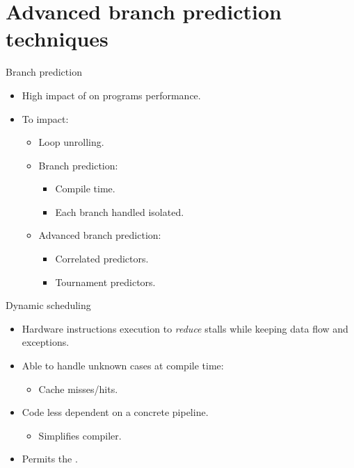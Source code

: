 \section{Advanced branch prediction techniques}

\begin{frame}[t]{Branch prediction}
\begin{itemize}
  \item High impact of  on programs performance.

  \item To  impact:
    \begin{itemize}
      \item Loop unrolling.
      \item Branch prediction:
        \begin{itemize}
          \item Compile time.
          \item Each branch handled isolated.
        \end{itemize}
      \item Advanced branch prediction:
        \begin{itemize}
          \item Correlated predictors.
          \item Tournament predictors.
        \end{itemize}
    \end{itemize}
\end{itemize}
\end{frame}

\begin{frame}[t]{Dynamic scheduling}
\begin{itemize}
  \item Hardware  instructions execution to \emph{reduce} stalls
        while keeping data flow and exceptions.

  \item Able to handle unknown cases at compile time:
    \begin{itemize}
      \item Cache misses/hits.
    \end{itemize}

  \item Code less dependent on a concrete pipeline.
    \begin{itemize}
      \item Simplifies compiler.
    \end{itemize}

  \item Permits the .

\end{itemize}
\end{frame}

